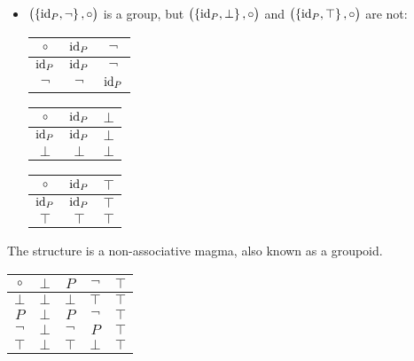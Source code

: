 \newpage
\begin{remark}
\ \begin{itemize}
	\item $\left(\set{\textnormal{id}_P,\lnot},\circ\right)$ is a group, but $\left(\set{\textnormal{id}_P,\bot},\circ\right)$ and $\left(\set{\textnormal{id}_P,\top},\circ\right)$ are not: \begin{table}[h!]\centering
	\begin{tabular}{c|cc}
		\hline
		$\circ$ & $\textnormal{id}_P$ & $\lnot$ \\ \hline
		$\textnormal{id}_P$ & $\textnormal{id}_P$ & $\lnot$ \\
		$\lnot$ & $\lnot$ & $\textnormal{id}_P$ \\ \hline
	\end{tabular}\quad\quad
	\begin{tabular}{c|cc}
		\hline
		$\circ$ & $\textnormal{id}_P$ & $\bot$ \\ \hline
		$\textnormal{id}_P$ & $\textnormal{id}_P$ & $\bot$ \\
		$\bot$ & $\bot$ & $\bot$ \\ \hline
	\end{tabular}\quad\quad
	\begin{tabular}{c|cc}
		\hline
		$\circ$ & $\textnormal{id}_P$ & $\top$ \\ \hline
		$\textnormal{id}_P$ & $\textnormal{id}_P$ & $\top$ \\
		$\top$ & $\top$ & $\top$ \\ \hline
	\end{tabular}
	\end{table}
\end{itemize}	
\end{remark}

\begin{remark}
The structure is a non-associative magma, also known as a groupoid. \begin{table}[h!]\centering
	\begin{tabular}{c||c|c|c|c}
		$\circ$ & $\bot$ & $P$ & $\lnot$ & $\top$ \\ \hline\hline
		$\bot$ & $\bot$ & $\bot$ & $\top$ & $\top$ \\ \hline
		$P$ & $\bot$ & $P$ & $\lnot$ & $\top$ \\ \hline
		$\lnot$ & $\bot$ & $\lnot$ & $P$ & $\top$ \\ \hline
		$\top$ & $\bot$ & $\top$ & $\bot$ & $\top$
	\end{tabular}
\end{table}
\end{remark}

